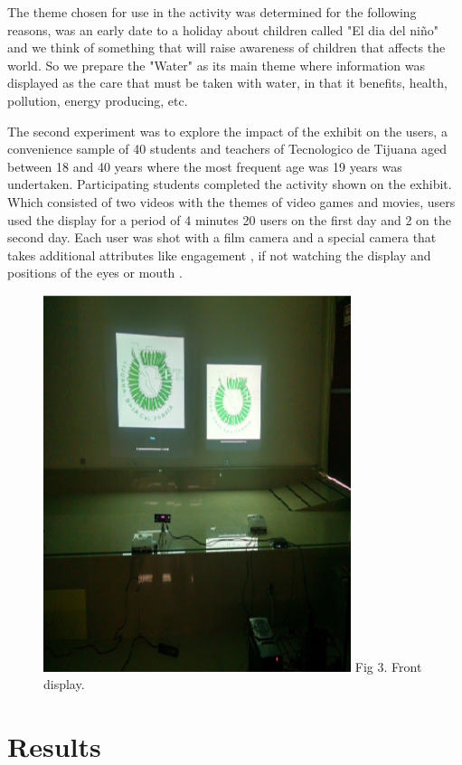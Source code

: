\documentclass[journal]{IEEEtran}
\begin{document}
The theme chosen for use in the activity was determined for the following reasons, was an early date to a holiday about children called "El dia del niño" and we think of something that will raise awareness of children that affects the world. So we prepare the "Water" as its main theme where information was displayed as the care that must be taken with water, in that it benefits, health, pollution, energy producing, etc.

The second experiment was to explore the impact of the exhibit on the users, a convenience sample of 40 students and teachers of Tecnologico de Tijuana aged between 18 and 40 years where the most frequent age was 19 years was undertaken. Participating students completed the activity shown on the exhibit. Which consisted of two videos with the themes of video games and movies, users used the display for a period of 4 minutes 20 users on the first day and 2 on the second day. Each user was shot with a film camera and a special camera that takes additional attributes like engagement , if not watching the display and positions of the eyes or mouth .

\begin{figure}[ht]
	\centering
	\includegraphics [width=90mm] {frenteexhi.PNG}
	\label{fig:Figure 3}
	Fig 3. Front display.
\end{figure}

 


\section {Results}
\end{document}
